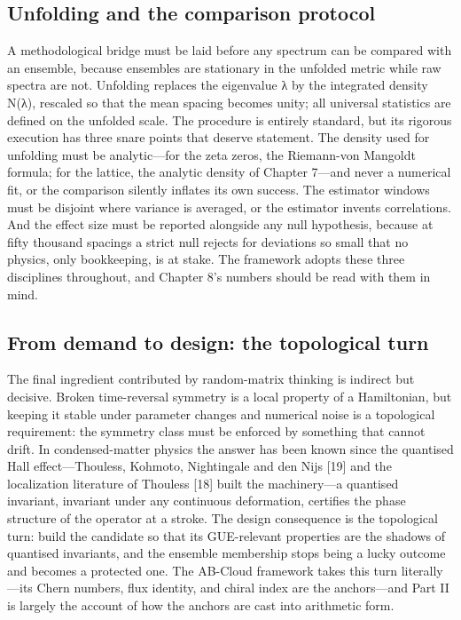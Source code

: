 \documentclass[10pt]{article}
\begin{document}
\subsection{Unfolding and the comparison protocol}\label{sec:24}
A methodological bridge must be laid before any spectrum can be compared with an ensemble, because ensembles are stationary in the unfolded metric while raw spectra are not. Unfolding replaces the eigenvalue λ by the integrated density N(λ), rescaled so that the mean spacing becomes unity; all universal statistics are defined on the unfolded scale. The procedure is entirely standard, but its rigorous execution has three snare points that deserve statement. The density used for unfolding must be analytic---for the zeta zeros, the Riemann-von Mangoldt formula; for the lattice, the analytic density of Chapter 7---and never a numerical fit, or the comparison silently inflates its own success. The estimator windows must be disjoint where variance is averaged, or the estimator invents correlations. And the effect size must be reported alongside any null hypothesis, because at fifty thousand spacings a strict null rejects for deviations so small that no physics, only bookkeeping, is at stake. The framework adopts these three disciplines throughout, and Chapter 8's numbers should be read with them in mind.

\subsection{From demand to design: the topological turn}\label{sec:25}
The final ingredient contributed by random-matrix thinking is indirect but decisive. Broken time-reversal symmetry is a local property of a Hamiltonian, but keeping it stable under parameter changes and numerical noise is a topological requirement: the symmetry class must be enforced by something that cannot drift. In condensed-matter physics the answer has been known since the quantised Hall effect---Thouless, Kohmoto, Nightingale and den Nijs [19] and the localization literature of Thouless [18] built the machinery---a quantised invariant, invariant under any continuous deformation, certifies the phase structure of the operator at a stroke. The design consequence is the topological turn: build the candidate so that its GUE-relevant properties are the shadows of quantised invariants, and the ensemble membership stops being a lucky outcome and becomes a protected one. The AB-Cloud framework takes this turn literally---its Chern numbers, flux identity, and chiral index are the anchors---and Part II is largely the account of how the anchors are cast into arithmetic form.
\end{document}

